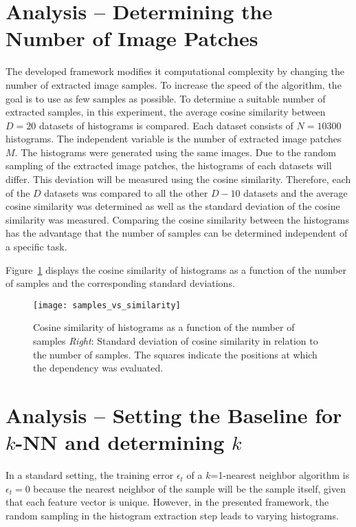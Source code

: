 \section{Analysis -- Determining the Number of Image Patches}
\label{sec:numtextons}

The developed framework modifies it computational complexity by
changing the number of extracted image samples. To increase the speed
of the algorithm, the goal is to use as few samples as possible. To
determine a suitable number of extracted samples, in this experiment,
the average cosine similarity between $D = 20$ datasets of histograms
is compared. Each dataset consists of $N = 10300$ histograms. The
independent variable is the number of extracted image patches $M$. The
histograms were generated using the same images. Due to the random
sampling of the extracted image patches, the histograms of each
datasets will differ. This deviation will be measured using the cosine
similarity. Therefore, each of the $D$ datasets was compared to all
the other $D - 10$ datasets and the average cosine similarity was
determined as well as the standard deviation of the cosine similarity
was measured. Comparing the cosine similarity between the histograms
has the advantage that the number of samples can be determined
independent of a specific task.

Figure~\ref{fig:cosine} displays the cosine similarity of histograms
as a function of the number of samples and the corresponding standard
deviations.

\begin{figure}[h!]
\begin{center}
\texttt{[image: samples\_vs\_similarity]}
\caption{{\label{fig:cosine} Cosine similarity of histograms as a
    function of the number of samples \emph{Right}: Standard deviation
    of cosine similarity in relation to the number of samples. The
    squares indicate the positions at which the dependency was
    evaluated.%
  }}
\end{center}
\end{figure}


\section{Analysis -- Setting the Baseline for $k$-NN and determining
  $k$}
\label{sec:detk}

In a standard setting, the training error $\epsilon_t$ of a
$k$=1-nearest neighbor algorithm is $\epsilon_t = 0$ because the
nearest neighbor of the sample will be the sample itself, given that
each feature vector is unique. However, in the presented framework,
the random sampling in the histogram extraction step leads to varying
histograms.

